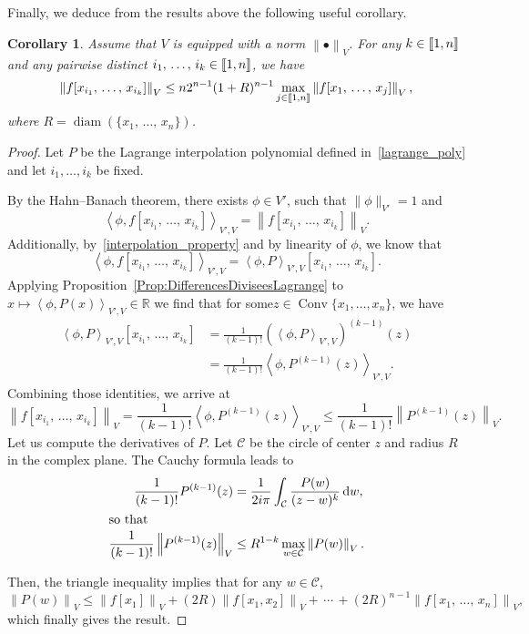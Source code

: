 \documentclass[11pt]{article}
\newtheorem{coro}[theo]{Corollary}
\theoremstyle{definition}
\numberwithin{equation}{section}
\numberwithin{figure}{section}
\numberwithin{table}{section}
\DeclareMathOperator{\Conv}{Conv}
\newcommand{\llbracket}{\mathopen{[\mkern -2.7mu[}}
\newcommand{\rrbracket}{\mathclose{]\mkern -2.7mu]}}
\newcommand{\inter}[2]{\llbracket #1,#2 \rrbracket}
\newcommand{\normeV}[1]{\left\| #1 \right\|_V}
\newcommand{\dualV}[2]{\left\langle #1, #2 \right\rangle_{V',V}}
\newcommand{\CC}{\mathcal{C}}
\newcommand{\R}{\mathbb{R}}
\newcommand{\md}{\mathrm{d}}
\DeclareMathOperator{\diam}{diam}
\renewcommand{\cdot}{{\scriptstyle \bullet}}
\begin{document}
Finally, we deduce from the results above the following useful corollary.
\begin{coro}\label{Coro:esti_diff_divisees_quelconques}
Assume that $V$ is equipped with a norm $\normeV{\cdot}$. For any $k\in \inter{1}{n}$ and any pairwise distinct $i_1,\,\dotsc,\,i_k\in \inter{1}{n}$, we have
\[
\normeV{f[x_{i_1},\,\dotsc,\,x_{i_k}]} \leq n 2^{n-1} (1+R)^{n-1} \max\limits_{j\in \inter{1}{n}} \normeV{f[x_1,\,\dotsc,\,x_j]},
\]
where $R=\diam(\{x_1,\,\dotsc,\,x_n\})$.
\end{coro}

\begin{proof}
Let $P$ be the Lagrange interpolation polynomial defined in~\eqref{lagrange_poly} and let $i_1,\dotsc,i_k$ be fixed.

By the Hahn--Banach theorem, there exists $\phi\in V'$, such that $\| \phi \|_{V'}=1$ and
\[
\dualV{\phi}{f[x_{i_1},\,\dotsc,\,x_{i_k}]} = \normeV{f[x_{i_1},\,\dotsc,\,x_{i_k}]}.
\]
Additionally, by~\eqref{interpolation_property} and by linearity of $\phi$, we know that
\[
\dualV{\phi}{f[x_{i_1},\,\dotsc,\,x_{i_k}]} = \dualV{\phi}{P} [x_{i_1},\,\dotsc,\,x_{i_k}].
\]
Applying Proposition~\ref{Prop:DifferencesDiviseesLagrange} to $x\mapsto \dualV{\phi}{P(x)} \in \R$ we find that for some\linebreak$z\in \Conv \{ x_1, \dots, x_n \}$, we have
\begin{align*}
\dualV{\phi}{P} [x_{i_1},\,\dotsc,\,x_{i_k}] &= \frac{1}{(k-1)!} \left(\dualV{\phi}{P}\right)^{(k-1)}(z)
\\
&= \frac{1}{(k-1)!} \dualV{\phi}{P^{(k-1)}(z)}.
\end{align*}
Combining those identities, we arrive at
\[
\normeV{f[x_{i_1},\,\dotsc,\,x_{i_k}]} = \frac{1}{(k-1)!} \dualV{\phi}{P^{(k-1)}(z)} \leq \frac{1}{(k-1)!} \normeV{P^{(k-1)}(z)}.
\]
Let us compute the derivatives of $P$. Let $\CC$ be the circle of center $z$ and radius $R$ in the complex plane. The Cauchy formula leads to
\begin{align*}
\frac{1}{(k-1)!} P^{(k-1)}(z) &= \frac{1}{2i\pi} \int_\CC \frac{P(w)}{(z-w)^k} \, \md w,
\\
\intertext{so that}
\frac{1}{(k-1)!} \normeV{P^{(k-1)}(z)} &\leq R^{1-k} \max_{w\in \CC} \normeV{P(w)}.
\end{align*}

Then, the triangle inequality implies that for any $w \in \CC$,
\[
\normeV{P(w)} \leq \normeV{f[x_1]} + (2R) \normeV{f[x_1,x_2]} +\,\cdots\,+ (2R)^{n-1} \normeV{f[x_1,\,\dotsc,\,x_n]},
\]
which finally gives the result.
\end{proof}
\end{document}
